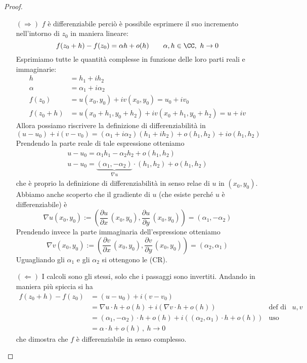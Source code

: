 \begin{proof}\leavevmode
\begin{enumerate}
    \item [$(\Rightarrow)$] $f$ è differenziabile perciò è possibile esprimere il suo incremento nell'intorno di $z_0$ in maniera lineare:
    \begin{equation*}
    f(z_0+h)-f(z_0)=\alpha h+o(h)\qquad \alpha,h\in\CC,\ h\to 0
    \end{equation*}
    Esprimiamo tutte le quantità complesse in funzione delle loro parti reali e immaginarie:
    \begin{align*}
    h&=h_1+ih_2\\
    \alpha&=\alpha_1+i\alpha_2 \\
    f(z_0)&=u(x_0,y_0)+iv(x_0,y_0)=u_0+iv_0 \\
    f(z_0+h)&=u(x_0+h_1,y_0+h_2)+iv(x_0+h_1,y_0+h_2)=u+iv    
    \end{align*}
    Allora possiamo riscrivere la definizione di differenziabilità in
    \begin{equation*}
    (u-u_0)+i(v-v_0)=(\alpha_1+i\alpha_2)(h_1+ih_2)+o(h_1,h_2)+io(h_1,h_2)
    \end{equation*}
    Prendendo la parte reale di tale espressione otteniamo
    \begin{gather*}
    u-u_0=\alpha_1h_1-\alpha_2h_2+o(h_1,h_2) \\
    u-u_0=\underbrace{(\alpha_1,-\alpha_2)}_{\nabla u}\cdot (h_1,h_2)+o(h_1,h_2)
    \end{gather*}
    che è proprio la definizione di differenziabilità in senso relae di $u$ in $(x_0,y_0)$. Abbiamo anche scoperto che il gradiente di $u$ (che esiste perché $u$ è differenziabile) è
    \begin{equation*}
    \nabla u(x_0,y_0):=\left(\frac{\partial u}{\partial x}\,(x_0,y_0),\frac{\partial u}{\partial y}\,(x_0,y_0)\right)=(\alpha_1,-\alpha_2)
    \end{equation*}
    Prendendo invece la parte immaginaria dell'espressione otteniamo
    \begin{equation*}
    \nabla v(x_0,y_0):=\left(\frac{\partial v}{\partial x}\,(x_0,y_0),\frac{\partial v}{\partial y}\,(x_0,y_0)\right)=(\alpha_2,\alpha_1)
    \end{equation*}
    Uguagliando gli $\alpha_1$ e gli $\alpha_2$ si ottengono le (CR).

    \item [$(\Leftarrow)$] I calcoli sono gli stessi, solo che i passaggi sono invertiti. Andando in maniera più spiccia si ha
    \begin{align*}
    f(z_0+h)-f(z_0)&=(u-u_0)+i(v-v_0) &\\
    &=\nabla u\cdot h+o(h)+i\left(\nabla v\cdot h+o(h)\right) &\text{def di diff per }u,v \\
    &=(\alpha_1,-\alpha_2)\cdot h+o(h)+i\left((\alpha_2,\alpha_1)\cdot h+o(h)\right) &\text{uso (CR)} \\
    &=\alpha\cdot h+o(h)\,,\ h\to 0
    \end{align*}
    che dimostra che $f$ è differenziabile in senso complesso.
\end{enumerate}
\end{proof}

